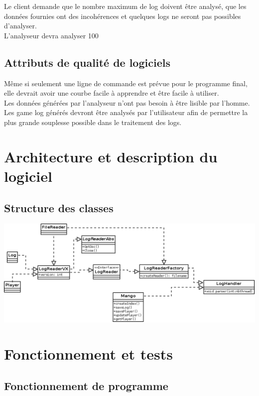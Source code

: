 \documentclass{scrreprt}
\begin{document}
Le client demande que le nombre maximum de log doivent être analysé, que les données fournies ont des incohérences et quelques logs ne seront pas possibles d'analyser.\\
L'analyseur devra analyser 100%
\section{Attributs de qualité de logiciels}

Même si seulement une ligne de commande est prévue pour le programme final, elle devrait avoir une courbe facile à apprendre et être facile à utiliser.\\
Les données générées par l'analyseur n’ont pas besoin à être lisible par l'homme.\\
Les game log générés devront être analysés par l'utilisateur afin de permettre la plus grande souplesse possible dans le traitement des logs.


\chapter{Architecture et description du logiciel}

\section{Structure des classes}


\includegraphics[scale=0.45,keepaspectratio]{nouvelleArch}\\


\chapter{Fonctionnement et tests}
\section{Fonctionnement de programme}
\end{document}
